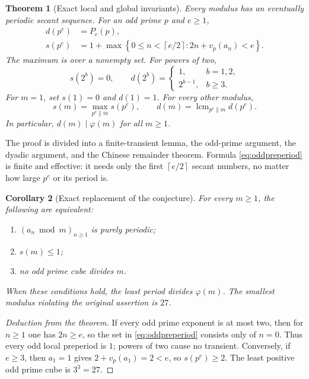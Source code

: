 \documentclass[11pt,a4paper]{article}
\numberwithin{equation}{section}
\newtheorem{theorem}{Theorem}[section]
\newtheorem{corollary}[theorem]{Corollary}
\theoremstyle{definition}
\newcommand{\ceil}[1]{\left\lceil #1\right\rceil}
\DeclareMathOperator{\lcm}{lcm}
\begin{document}
\begin{theorem}[Exact local and global invariants]\label{thm:main}
Every modulus has an eventually periodic secant sequence. For an odd
prime $p$ and $e\ge1$,
\begin{align}
 d(p^e)&=P_e(p),\label{eq:oddperiod}\\
 s(p^e)&=1+\max\left\{0\le n<\ceil{e/2}:
                  2n+v_p(a_n)<e\right\}.\label{eq:oddpreperiod}
\end{align}
The maximum is over a nonempty set. For powers of two,
\begin{equation}\label{eq:dyadic}
s(2^b)=0,\qquad
d(2^b)=\begin{cases}1,&b=1,2,\\2^{b-1},&b\ge3.\end{cases}
\end{equation}
For $m=1$, set $s(1)=0$ and $d(1)=1$. For every other modulus,
\begin{equation}\label{eq:CRT}
s(m)=\max_{p^e\parallel m}s(p^e),\qquad
d(m)=\lcm_{p^e\parallel m}d(p^e).
\end{equation}
In particular, $d(m)\mid\varphi(m)$ for all $m\ge1$.
\end{theorem}

The proof is divided into a finite-transient lemma, the odd-prime argument,
the dyadic argument, and the Chinese remainder theorem. Formula
\eqref{eq:oddpreperiod} is finite and effective: it needs only the first
$\ceil{e/2}$ secant numbers, no matter how large $p^e$ or its period is.

\begin{corollary}[Exact replacement of the conjecture]\label{cor:cubefree}
For every $m\ge1$, the following are equivalent:
\begin{enumerate}[label=(\roman*),nosep]
\item $(a_n\bmod m)_{n\ge1}$ is purely periodic;
\item $s(m)\le1$;
\item no odd prime cube divides $m$.
\end{enumerate}
When these conditions hold, the least period divides $\varphi(m)$.
The smallest modulus violating the original assertion is $27$.
\end{corollary}

\begin{proof}[Deduction from the theorem]
If every odd prime exponent is at most two, then for $n\ge1$ one has
$2n\ge e$, so the set in \eqref{eq:oddpreperiod} consists only of $n=0$.
Thus every odd local preperiod is $1$; powers of two cause no transient.
Conversely, if $e\ge3$, then $a_1=1$ gives
$2+v_p(a_1)=2<e$, so $s(p^e)\ge2$.
The least positive odd prime cube is $3^3=27$.
\end{proof}
\end{document}

